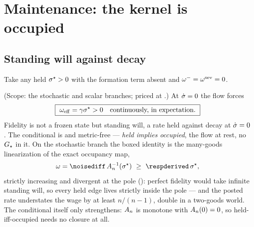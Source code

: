 \documentclass[../main]{subfiles}
\begin{document}
\clearpage
\section{Maintenance: the kernel is occupied}
\label{sec:maintenance}

\subsection{Standing will against decay}
\label{subsec:maint:standing}
%
Take any held $\sigma\sp{\star}>0$ with the formation term absent and $\omega\sp{-}=\omega\sp{\mathrm{sev}}=0$.

\begin{theorem}%
  (Scope: the stochastic and scalar branches; priced at .) At
  $\dot{\sigma}=0$ the flow forces
  \begin{equation}
    \boxed{\ \willeff=\decayrate\alignfixed>0\quad\text{continuously, in expectation.}\ }
    \label{eq:J:occ}
  \end{equation}
  Fidelity is not a frozen state but standing will, a rate held against decay at
  $\dot{\sigma}=0$. The conditional is  and metric-free --- \emph{held
  implies occupied}, the flow at rest, no $G\sb{\star}$ in it. On the stochastic
  branch the boxed identity is the many-goods linearization of the exact occupancy map,
  \begin{equation}
    \will=\noisediff\,\Abessel^{-1}(\alignfixed)\ \ge\ \respderived\,\alignfixed,
    \label{eq:J:occ:exact}
  \end{equation}
  strictly increasing and divergent at the pole (): perfect fidelity
  would take infinite standing will, so every held edge lives strictly inside the pole
  --- and the posted rate understates the wage by at least $n/(n-1)$, double in a
  two-goods world. The conditional itself only strengthens: $A\sb{n}$ is monotone with
  $A\sb{n}(0)=0$, so held-iff-occupied needs no closure at all.
\end{theorem}
\end{document}
